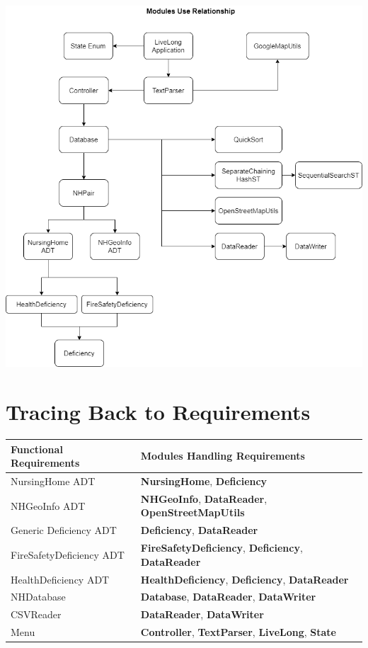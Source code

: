 \documentclass[12pt]{article}
\begin{document}
\begin{center}
\includegraphics[width=16cm]{Pictures/LiveLong ModulesUsage.png}
\end{center}




\newpage
\section{Tracing Back to Requirements}


\begin{center}
\begin{tabular}{|ll|}
\hline
Functional Requirements & Modules Handling Requirements \\
\hline
NursingHome ADT & \textbf{NursingHome}, \textbf{Deficiency}\\
\hline
NHGeoInfo ADT & \textbf{NHGeoInfo}, \textbf{DataReader}, \textbf{OpenStreetMapUtils}\\
\hline
Generic Deficiency ADT & \textbf{Deficiency},  \textbf{DataReader}\\
\hline
FireSafetyDeficiency ADT & \textbf{FireSafetyDeficiency}, \textbf{Deficiency},  \textbf{DataReader}\\
\hline
HealthDeficiency ADT & \textbf{HealthDeficiency}, \textbf{Deficiency},  \textbf{DataReader}\\
\hline
NHDatabase & \textbf{Database}, \textbf{DataReader}, \textbf{DataWriter}\\
\hline
CSVReader & \textbf{DataReader}, \textbf{DataWriter} \\
\hline
Menu & \textbf{Controller}, \textbf{TextParser}, \textbf{LiveLong}, \textbf{State}\\
\hline
\end{tabular}
\end{center}
\end{document}
